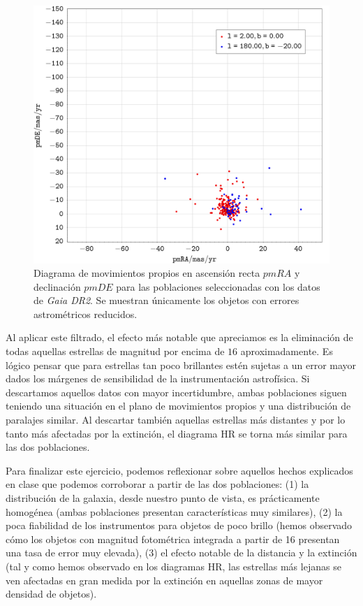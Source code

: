 \documentclass[a4paper,fleqn,usenatbib]{mnras}
\begin{document}
\begin{figure}
  \includegraphics[width=\linewidth]{img/ejercicio1_pmra_pmde_filtered}
  \caption{Diagrama de movimientos propios en ascensión recta $pmRA$ y declinación $pmDE$ para las poblaciones seleccionadas con los datos de \emph{Gaia DR2}. Se muestran únicamente los objetos con errores astrométricos reducidos.}
  \label{fig:e1_pmrapmde_filtered}
\end{figure}

Al aplicar este filtrado, el efecto más notable que apreciamos es la eliminación de todas aquellas estrellas de magnitud por encima de $16$ aproximadamente. Es lógico pensar que para estrellas tan poco brillantes estén sujetas a un error mayor dados los márgenes de sensibilidad de la instrumentación astrofísica. Si descartamos aquellos datos con mayor incertidumbre, ambas poblaciones siguen teniendo una situación en el plano de movimientos propios y una distribución de paralajes similar. Al descartar también aquellas estrellas más distantes y por lo tanto más afectadas por la extinción, el diagrama HR se torna más similar para las dos poblaciones.

Para finalizar este ejercicio, podemos reflexionar sobre aquellos hechos explicados en clase que podemos corroborar a partir de las dos poblaciones: (1) la distribución de la galaxia, desde nuestro punto de vista, es prácticamente homogénea (ambas poblaciones presentan características muy similares), (2) la poca fiabilidad de los instrumentos para objetos de poco brillo (hemos observado cómo los objetos con magnitud fotométrica integrada a partir de 16 presentan una tasa de error muy elevada), (3) el efecto notable de la distancia y la extinción (tal y como hemos observado en los diagramas HR, las estrellas más lejanas se ven afectadas en gran medida por la extinción en aquellas zonas de mayor densidad de objetos).
\end{document}
